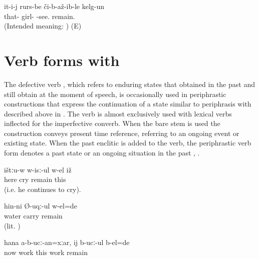 \begin{exe}
	\ex	\label{‎‎He was seeing the girls.UNGRAM}
	\gll * it-i-j	rurs-be	či-b-až-ib-le	kelg-un\\
	{} that-	girl-	-see.	remain.\\
	\glt {} (Intended meaning: ) (E)
\end{exe}





\section{Verb forms with \protect{} \protect{}}
\label{sec:Verb forms with b-el remain, stay}

The defective verb  , which refers to enduring states that obtained in the past and still obtain at the moment of speech, is occasionally used in periphrastic constructions that express the continuation of a state similar to periphrasis with  described above in . The verb  is almost exclusively used with lexical verbs inflected for the imperfective converb. When the bare stem  is used the construction conveys present time reference, referring to an ongoing event  or existing state. When the past enclitic is added to the verb, the periphrastic verb form denotes a past state or an ongoing situation in the past , .
%
\begin{exe}
	\ex	\label{ex:Here he is crying (i.e. he continues to cry).}
	\gll	ištːu-w	w-isː-ul	w-el	iž\\
		here	cry	remain	this\\
	\glt	{} (i.e. he continues to cry).

	\ex	\label{ex:‎‎‎He was taken away by the water}
	\gll	hin-ni	Ø-uqː-ul	w-el=de\\
		water	carry	remain\\
	\glt	{} (lit. )

	\ex	\label{ex:‎‎Even though now (my hand) does not work, (at that time) it worked}
	\gll	hana	a-b-ucː-an=xːar,	ij	b-ucː-ul	b-el=de\\
		now	work	this	work	remain\\
	\glt	{}
	
\end{exe}

